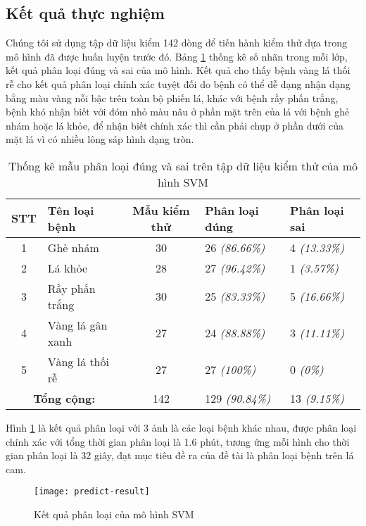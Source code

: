 \subsection{Kết quả thực nghiệm}
Chúng tôi sử dụng tập dữ liệu kiểm 142 dòng để tiến hành kiểm thử dựa trong mô hình đã được huấn luyện trước đó. Bảng \ref{tab:test-dataset} thống kê số nhãn trong mỗi lớp, kết quả phân loại đúng và sai của mô hình. Kết quả cho thấy bệnh vàng lá thối rễ cho kết quả phân loại chính xác tuyệt đối do bệnh có thể dễ dạng nhận dạng bằng màu vàng nỗi bậc trên toàn bộ phiến lá, khác với bệnh rầy phấn trắng, bệnh khó nhận biết với đóm nhỏ màu nâu ở phần mặt trên của lá với bệnh ghẻ nhám hoặc lá khỏe, để nhận biết chính xác thì cần phải chụp ở phần dưới của mặt lá vì có nhiều lông sáp hình dạng tròn.\par

\begin{table}[h]
\caption{Thống kê mẫu phân loại đúng và sai trên tập dữ liệu kiểm thử của mô hình SVM}
\centering
\begin{tabular}{|c|l|c|l|l|}
\hline
\textbf{STT} & \textbf{Tên loại bệnh} & \textbf{Mẫu kiểm thử} & \textbf{Phân loại đúng} & \textbf{Phân loại sai}\\ [0.5ex] \hline \hline
1 & Ghẻ nhám & 30 & 26 \emph{(86.66\%)} & 4 \emph{(13.33\%)} \\
2 & Lá khỏe & 28 & 27 \emph{(96.42\%)} & 1 \emph{(3.57\%)}\\
3 & Rầy phấn trắng & 30 & 25 \emph{(83.33\%)} & 5 \emph{(16.66\%)}\\
4 & Vàng lá gân xanh & 27 & 24 \emph{(88.88\%)} & 3 \emph{(11.11\%)}\\
5 & Vàng lá thối rễ & 27 & 27 \emph{(100\%)} & 0 \emph{(0\%)}\\ \hline
\multicolumn{2}{|c|}{\textbf{Tổng cộng:}} & 142 & 129 \emph{(90.84\%)} & 13 \emph{(9.15\%)} \\ \hline
\end{tabular}
\label{tab:test-dataset}
\end{table}

Hình \ref{fig:predict-result} là kết quả phân loại với 3 ảnh là các loại bệnh khác nhau, được phân loại chính xác với tổng thời gian phân loại là 1.6 phút, tương ứng mỗi hình cho thời gian phân loại là 32 giây, đạt mục tiêu đề ra của đề tài là phân loại bệnh trên lá cam.

\begin{figure}[!htp]
	\centering
	\texttt{[image: predict-result]}
	\caption{Kết quả phân loại của mô hình SVM}
	\label{fig:predict-result}
\end{figure}

